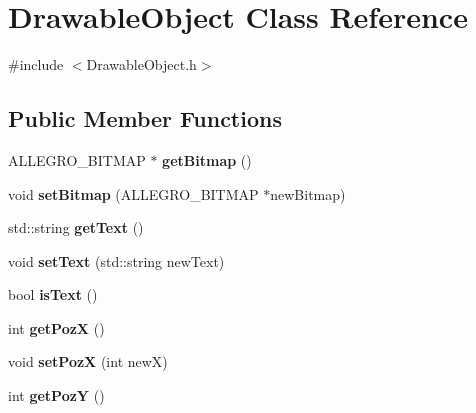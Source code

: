 \hypertarget{classDrawableObject}{}\section{Drawable\+Object Class Reference}
\label{classDrawableObject}


{\ttfamily \#include $<$Drawable\+Object.\+h$>$}

\subsection*{Public Member Functions}
\begin{DoxyCompactItemize}
\item 
A\+L\+L\+E\+G\+R\+O\+\_\+\+B\+I\+T\+M\+AP $\ast$ {\bfseries get\+Bitmap} ()\hypertarget{classDrawableObject_a24589e56097b354e54daff2351ef8646}{}\label{classDrawableObject_a24589e56097b354e54daff2351ef8646}

\item 
void {\bfseries set\+Bitmap} (A\+L\+L\+E\+G\+R\+O\+\_\+\+B\+I\+T\+M\+AP $\ast$new\+Bitmap)\hypertarget{classDrawableObject_af24ffb9aa05616ecfe7a91076e4ef9f1}{}\label{classDrawableObject_af24ffb9aa05616ecfe7a91076e4ef9f1}

\item 
std\+::string {\bfseries get\+Text} ()\hypertarget{classDrawableObject_a10c3b5011225e6336609f7fa1a5081cc}{}\label{classDrawableObject_a10c3b5011225e6336609f7fa1a5081cc}

\item 
void {\bfseries set\+Text} (std\+::string new\+Text)\hypertarget{classDrawableObject_aa1cfa32a445847c11f08e8d730908dee}{}\label{classDrawableObject_aa1cfa32a445847c11f08e8d730908dee}

\item 
bool {\bfseries is\+Text} ()\hypertarget{classDrawableObject_ae635cb4eeca6c33ee243f00004a920a2}{}\label{classDrawableObject_ae635cb4eeca6c33ee243f00004a920a2}

\item 
int {\bfseries get\+PozX} ()\hypertarget{classDrawableObject_af22b9de5fd585984890a84266ffd4e82}{}\label{classDrawableObject_af22b9de5fd585984890a84266ffd4e82}

\item 
void {\bfseries set\+PozX} (int newX)\hypertarget{classDrawableObject_ae7d27907929ab4536882b2a8eed38758}{}\label{classDrawableObject_ae7d27907929ab4536882b2a8eed38758}

\item 
int {\bfseries get\+PozY} ()\hypertarget{classDrawableObject_af777ba956aa537c2010503e7afd9c989}{}\label{classDrawableObject_af777ba956aa537c2010503e7afd9c989}


\end{DoxyCompactItemize}
